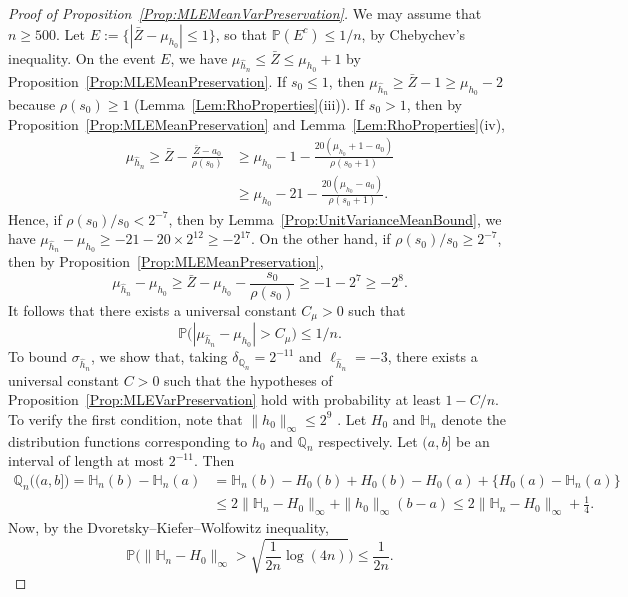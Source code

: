 \documentclass[a4paper,12pt]{article}
\begin{document}
\begin{proof}[Proof of Proposition~\ref{Prop:MLEMeanVarPreservation}]
We may assume that $n \geq 500$.  Let $E := \{ | \bar{Z} - \mu_{h_0} | \leq 1\}$, so that $\mathbb{P}(E^c) \leq 1/n$, by Chebychev's inequality.  On the event $E$, we have  $\mu_{\hat{h}_n} \leq \bar{Z} \leq \mu_{h_0} + 1$ by Proposition~\ref{Prop:MLEMeanPreservation}.  If $s_0 \leq 1$, then $\mu_{\hat{h}_n} \geq \bar{Z} - 1 \geq \mu_{h_0} - 2$ because $\rho(s_0) \geq 1$ (Lemma~\ref{Lem:RhoProperties}(iii)). If $s_0 > 1$, then by Proposition~\ref{Prop:MLEMeanPreservation} and Lemma~\ref{Lem:RhoProperties}(iv),
\begin{align*}
  \mu_{\hat{h}_n} \geq \bar{Z} - \frac{\bar{Z} - a_0}{\rho(s_0)} &\geq \mu_{h_0} - 1 - \frac{20(\mu_{h_0} + 1 - a_0)}{\rho(s_0+1)} \\
                               & \geq \mu_{h_0} - 21 - \frac{20(\mu_{h_0} - a_0)}{\rho(s_0+1)}.
\end{align*}
Hence, if $\rho(s_0)/s_0 < 2^{-7}$, then by Lemma~\ref{Prop:UnitVarianceMeanBound}, we have $\mu_{\hat{h}_n} - \mu_{h_0} \geq -21 - 20 \times 2^{12} \geq -2^{17}$.  On the other hand, if $\rho(s_0)/s_0 \geq 2^{-7}$, then by Proposition~\ref{Prop:MLEMeanPreservation},
\[
\mu_{\hat{h}_n} - \mu_{h_0} \geq \bar{Z} - \mu_{h_0} - \frac{s_0}{\rho(s_0)} \geq -1 - 2^7 \geq -2^8.
\]
It follows that there exists a universal constant $C_\mu > 0$ such that
\[
\mathbb{P}\bigl(|\mu_{\hat{h}_n} - \mu_{h_0}| > C_\mu\bigr) \leq 1/n.
\]
To bound $\sigma_{\hat{h}_n}$, we show that, taking $\delta_{\mathbb{Q}_n} = 2^{-11}$ and $\ell_{\hat{h}_n} = -3$, there exists a universal constant $C > 0$ such that the hypotheses of Proposition~\ref{Prop:MLEVarPreservation} hold with probability at least $1 - C/n$.  To verify the first condition, note that $\| h_0 \|_\infty \leq 2^9$ \citep[][Theorem~5.14(b) and (d)]{lovasz2007geometry}. Let $H_0$ and $\mathbb{H}_n$ denote the distribution functions corresponding to $h_0$ and $\mathbb{Q}_n$ respectively.  Let $(a, b]$ be an interval of length at most $2^{-11}$.  Then
\begin{align*}
  \mathbb{Q}_n\bigl((a,b]\bigr) = \mathbb{H}_n(b) - \mathbb{H}_n(a) &= \mathbb{H}_n(b) - H_0(b) + H_0(b) - H_0(a) + \{H_0(a) - \mathbb{H}_n(a)\} \\
                  &\leq 2 \| \mathbb{H}_n - H_0 \|_\infty + \| h_0 \|_\infty (b - a) \leq 2 \| \mathbb{H}_n - H_0 \|_\infty + \frac{1}{4}.
\end{align*}
Now, by the Dvoretsky--Kiefer--Wolfowitz inequality, 
\[
\mathbb{P}\biggl(\| \mathbb{H}_n - H_0 \|_{\infty} > \sqrt{\frac{1}{2n} \log (4n)}\biggr) \leq \frac{1}{2n}.
\]
\end{proof}
\end{document}
